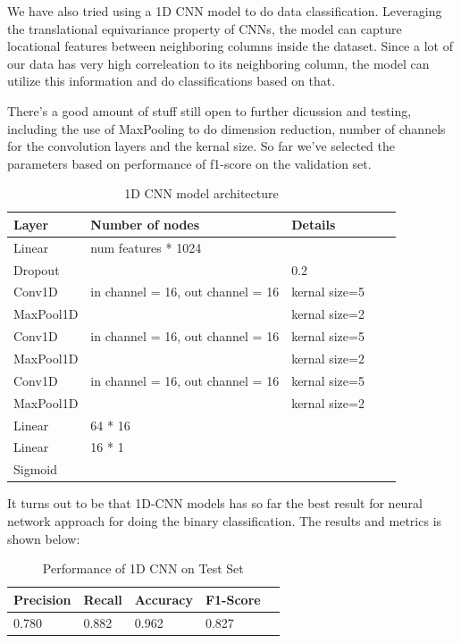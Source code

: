 \documentclass[10pt,letterpaper]{article}
\begin{document}
We have also tried using a 1D CNN model to do data classification. Leveraging the translational equivariance property of CNNs, the model can capture locational features between neighboring columns inside the dataset. Since a lot of our data has very high correleation to its neighboring column, the model can utilize this information and do classifications based on that.

There's a good amount of stuff still open to further dicussion and testing, including the use of MaxPooling to do dimension reduction, number of channels for the convolution layers and the kernal size. So far we've selected the parameters based on performance of f1-score on the validation set.

\begin{table}[H]
\centering
\footnotesize
\begin{tabular}{lllll}
\toprule
\textbf{Layer} & \textbf{Number of nodes} & \textbf{Details} \\
\midrule
Linear & num features * 1024 & \\
Dropout & & 0.2 \\
Conv1D & in channel = 16, out channel = 16 & kernal size=5\\
MaxPool1D &  & kernal size=2\\
Conv1D & in channel = 16, out channel = 16 & kernal size=5\\
MaxPool1D & & kernal size=2\\
Conv1D & in channel = 16, out channel = 16 & kernal size=5\\
MaxPool1D & & kernal size=2\\
Linear & 64 * 16 & \\
Linear & 16 * 1 & \\
Sigmoid & & \\
\bottomrule
\end{tabular}
\caption{1D CNN model architecture}
\end{table}
It turns out to be that 1D-CNN models has so far the best result for neural network approach for doing the binary classification. The results and metrics is shown below:

\begin{table}[H]
\centering
\footnotesize
\begin{tabular}{lllll}
\toprule
\textbf{Precision} & \textbf{Recall} & \textbf{Accuracy} &  \textbf{F1-Score}\\
\midrule
0.780 & 0.882 & 0.962 & 0.827  \\
\bottomrule
\end{tabular}
\caption{Performance of 1D CNN on Test Set}%
\end{table}
\end{document}
